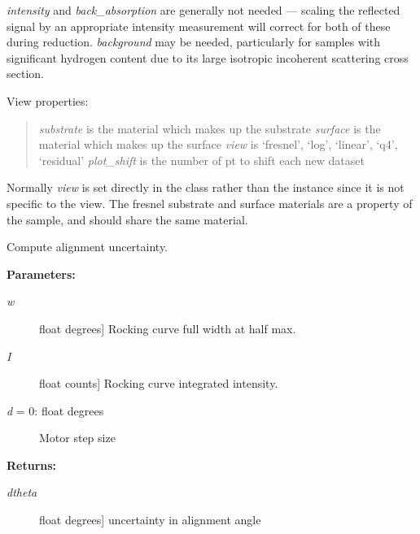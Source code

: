 \documentclass[letterpaper,10pt,english]{sphinxmanual}
\begin{document}
\begin{fulllineitems}
\emph{intensity} and \emph{back\_absorption} are generally not needed --- scaling
the reflected signal by an appropriate intensity measurement will correct
for both of these during reduction.  \emph{background} may be needed,
particularly for samples with significant hydrogen content due to its
large isotropic incoherent scattering cross section.

View properties:
\begin{quote}

\emph{substrate} is the material which makes up the substrate
\emph{surface} is the material which makes up the surface
\emph{view} is `fresnel', `log', `linear', `q4', `residual'
\emph{plot\_shift} is the number of pt to shift each new dataset
\end{quote}

Normally \emph{view} is set directly in the class rather than the
instance since it is not specific to the view.  The fresnel
substrate and surface materials are a property of the sample,
and should share the same material.

\begin{fulllineitems}
\label{api/probe:refl1d.probe.Probe.Q}
\end{fulllineitems}


\begin{fulllineitems}
\label{api/probe:refl1d.probe.Probe.alignment_uncertainty}
Compute alignment uncertainty.

\textbf{Parameters:}
\begin{description}
\item[{\emph{w}}] \leavevmode{[}float \textbar{} degrees{]}
Rocking curve full width at half max.

\item[{\emph{I}}] \leavevmode{[}float \textbar{} counts{]}
Rocking curve integrated intensity.

\item[{\emph{d} = 0: float \textbar{} degrees}] \leavevmode
Motor step size

\end{description}

\textbf{Returns:}
\begin{description}
\item[{\emph{dtheta}}] \leavevmode{[}float \textbar{} degrees{]}
uncertainty in alignment angle


\end{description}
\end{fulllineitems}
\end{fulllineitems}
\end{document}
